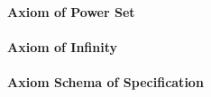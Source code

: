 





\paragraph{Axiom of Power Set}


\paragraph{Axiom of Infinity}



\paragraph{Axiom Schema of Specification}




